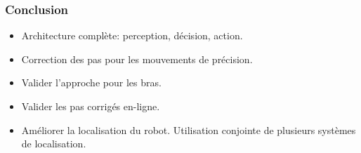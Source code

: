 \documentclass[14pt,utf8,hyperref={pdfpagelabels=false}]{beamer}
\begin{document}
\begin{frame}
  \frametitle{Conclusion}


  \begin{itemize}
  \item Architecture complète: perception, décision, action.
  \item Correction des pas pour les mouvements de précision.
  \end{itemize}

  \bigskip

  \begin{itemize}
  \item Valider l'approche pour les bras.
  \item Valider les pas corrigés en-ligne.
  \item Améliorer la localisation du robot. Utilisation conjointe de
    plusieurs systèmes de localisation.
  \end{itemize}
\end{frame}



%
%


\end{document}

